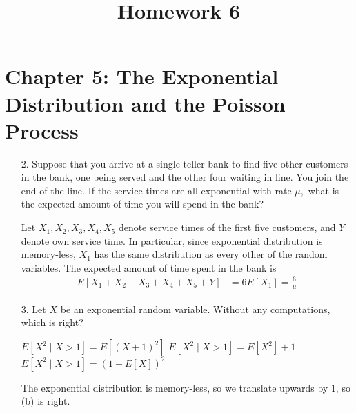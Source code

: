 \documentclass{article}
\begin{document}
\title{Homework 6}
\maketitle
\thispagestyle{fancy}

\section*{Chapter 5: The Exponential Distribution and the Poisson Process}

\begin{itemize}
	\item[2.] Suppose that you arrive at a single-teller bank to find five other customers in the bank, one being served and the other four waiting in line. You join the end of the line. If the service times are all exponential with rate $\mu,$ what is the expected amount of time you will spend in the bank?
		\begin{soln}
			Let $X_1, X_2, X_3, X_4, X_5$ denote service times of the first five customers, and $Y$ denote own service time. In particular, since exponential distribution is memory-less, $X_1$ has the same distribution as every other of the random variables. The expected amount of time spent in the bank is
			\begin{align*}
				E[X_1+X_2+X_3+X_4+X_5+Y] &= 6E[X_1] = \frac{6}{\mu}
			\end{align*}
		\end{soln}

	\item[3.] Let $X$ be an exponential random variable. Without any computations, which is right?
		\begin{enumerate}[(a)]
			\ii $E[X^2\mid X>1]=E[(X+1)^2]$ 
			\ii $E[X^2\mid X>1]=E[X^2]+1$
			\ii $E[X^2\mid X>1]=(1+E[X])^2$
		\end{enumerate}
		\begin{answer*}
			The exponential distribution is memory-less, so we translate upwards by 1, so (b) is right.
		\end{answer*}


\end{itemize}
\end{document}
